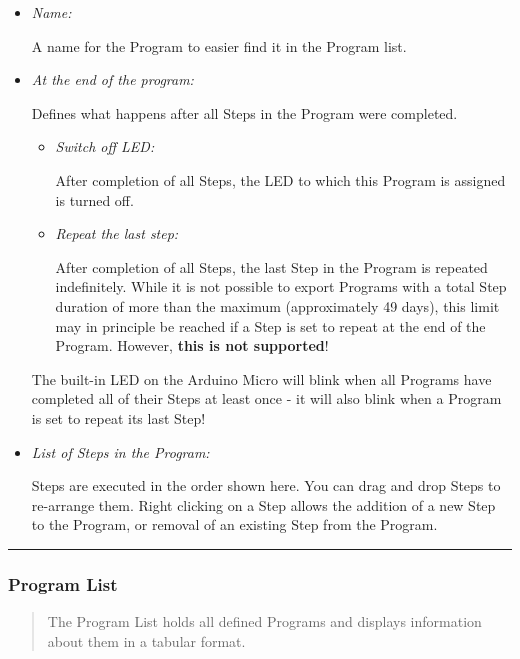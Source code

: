 \begin{itemize}
\item
  \emph{Name:}

  A name for the Program to easier find it in the Program list.
\item
  \emph{At the end of the program:}

  Defines what happens after all Steps in the Program were completed.

  \begin{itemize}
  \item
    \emph{Switch off LED:}

    After completion of all Steps, the LED to which this Program is
    assigned is turned off.
  \item
    \emph{Repeat the last step:}

    After completion of all Steps, the last Step in the Program is
    repeated indefinitely. While it is not possible to export Programs
    with a total Step duration of more than the maximum (approximately
    49 days), this limit may in principle be reached if a Step is set to
    repeat at the end of the Program. However, \textbf{this is not
    supported}!
  \end{itemize}

  The built-in LED on the Arduino Micro will blink when all Programs
  have completed all of their Steps at least once - it will also blink
  when a Program is set to repeat its last Step!
\item
  \emph{List of Steps in the Program:}

  Steps are executed in the order shown here. You can drag and drop
  Steps to re-arrange them. Right clicking on a Step allows the addition
  of a new Step to the Program, or removal of an existing Step from the
  Program.
\end{itemize}

\begin{center}\rule{0.5\linewidth}{0.5pt}\end{center}

\hypertarget{program-list}{%
\subsubsection{Program List}\label{program-list}}

\begin{quote}
The Program List holds all defined Programs and displays information
about them in a tabular format.
\end{quote}

